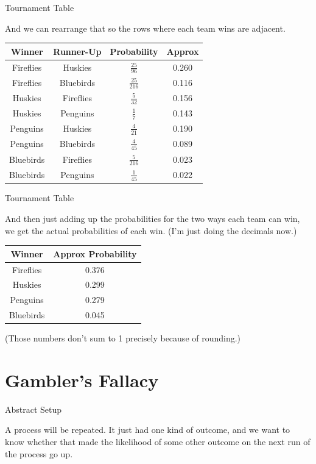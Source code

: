 \documentclass[
  ignorenonframetext,
]{beamer}
\renewcommand{\,}{\text{, }}
\begin{document}
\begin{frame}{Tournament Table}
\protect\hypertarget{tournament-table-1}{}

And we can rearrange that so the rows where each team wins are adjacent.

\begin{longtable}[]{@{}cccc@{}}
\toprule
Winner & Runner-Up & Probability & Approx\tabularnewline
\midrule
\endhead
Fireflies & Huskies & \(\frac{25}{96}\) & 0.260\tabularnewline
Fireflies & Bluebirds & \(\frac{25}{216}\) & 0.116\tabularnewline
Huskies & Fireflies & \(\frac{5}{32}\) & 0.156\tabularnewline
Huskies & Penguins & \(\frac{1}{7}\) & 0.143\tabularnewline
Penguins & Huskies & \(\frac{4}{21}\) & 0.190\tabularnewline
Penguins & Bluebirds & \(\frac{4}{45}\) & 0.089\tabularnewline
Bluebirds & Fireflies & \(\frac{5}{216}\) & 0.023\tabularnewline
Bluebirds & Penguins & \(\frac{1}{45}\) & 0.022\tabularnewline
\bottomrule
\end{longtable}

\end{frame}

\begin{frame}{Tournament Table}
\protect\hypertarget{tournament-table-2}{}

And then just adding up the probabilities for the two ways each team can
win, we get the actual probabilities of each win. (I'm just doing the
decimals now.)

\begin{longtable}[]{@{}cc@{}}
\toprule
Winner & Approx Probability\tabularnewline
\midrule
\endhead
Fireflies & 0.376\tabularnewline
Huskies & 0.299\tabularnewline
Penguins & 0.279\tabularnewline
Bluebirds & 0.045\tabularnewline
\bottomrule
\end{longtable}

(Those numbers don't sum to 1 precisely because of rounding.)

\end{frame}

\hypertarget{gamblers-fallacy}{%
\section{Gambler's Fallacy}\label{gamblers-fallacy}}

\begin{frame}{Abstract Setup}
\protect\hypertarget{abstract-setup}{}

A process will be repeated. It just had one kind of outcome, and we want
to know whether that made the likelihood of some other outcome on the
next run of the process go up.

\end{frame}
\end{document}
